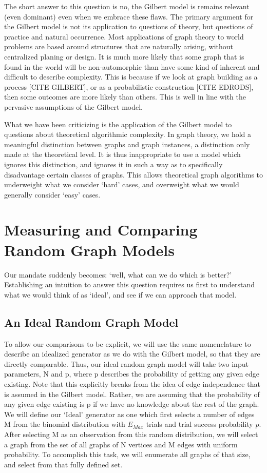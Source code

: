 \documentclass[11pt,a4paper]{report}
\begin{document}
The short answer to this question is no, the Gilbert model is remains relevant (even dominant) even when we embrace these flaws.
The primary argument for the Gilbert model is not its application to questions of theory, but questions of practice and natural occurrence.
Most applications of graph theory to world problems are based around structures that are naturally arising, without centralized planing or design.
It is much more likely that some graph that is found in the world will be non-automorphic than have some kind of inherent and difficult to describe complexity.
This is because if we look at graph building as a process [CITE GILBERT], or as a probabilistic construction [CITE EDRODS], then some outcomes are more likely than others.
This is well in line with the pervasive assumptions of the Gilbert model.  

What we have been criticizing is the application of the Gilbert model to questions about theoretical algorithmic complexity.
In graph theory, we hold a meaningful distinction between graphs and graph instances, a distinction only made at the theoretical level.
It is thus inappropriate to use a model which ignores this distinction, and ignores it in such a way as to specifically disadvantage certain classes of graphs.
This allows theoretical graph algorithms to underweight what we consider `hard' cases, and overweight what we would generally consider `easy' cases.

\section{Measuring and Comparing Random Graph Models}

Our mandate suddenly becomes: `well, what can we do which is better?'
Establishing an intuition to answer this question requires us first to understand what we would think of as `ideal', and see if we can approach that model.

\subsection{An Ideal Random Graph Model}
To allow our comparisons to be explicit, we will use the same nomenclature to describe an idealized generator as we do with the Gilbert model, so that they are directly comparable.
Thus, our ideal random graph model will take two input parameters, N and p, where p describes the probability of getting any given edge existing.
Note that this explicitly breaks from the idea of edge independence that is assumed in the Gilbert model.
Rather, we are assuming that the probability of any given edge existing is p if we have no knowledge about the rest of the graph.
We will define our `Ideal' generator as one which first selects a number of edges M from the binomial distribution with $E_{Max}$ trials and trial success probability $p$.
After selecting M as an observation from this random distribution, we will select a graph from the set of all graphs of N vertices and M edges with uniform probability.
To accomplish this task, we will enumerate all graphs of that size, and select from that fully defined set.
\end{document}

